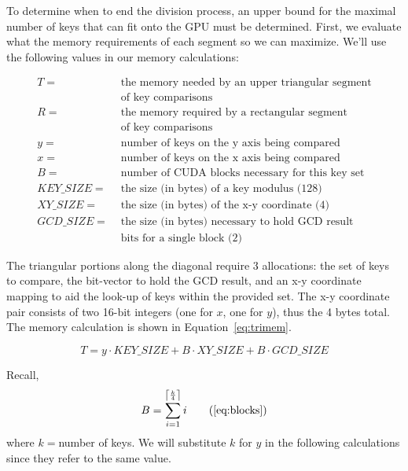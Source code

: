 \documentclass[12pt]{ucthesis}
\begin{document}
To determine when to end the division process, an upper bound for the maximal
number of keys that can fit onto the GPU must be determined. First, we evaluate
what the memory requirements of each segment so we can maximize. We'll use the
following values in our memory calculations:

\begin{displaymath}
   \begin{split}
   T = & \mbox{ the memory needed by an upper triangular segment}\\
       & \mbox{ of key comparisons}\\
   R = & \mbox{ the memory required by a rectangular segment}\\
       & \mbox{ of key comparisons}\\
   y = & \mbox{ number of keys on the y axis being compared}\\
   x = & \mbox{ number of keys on the x axis being compared}\\
   B = & \mbox{ number of CUDA blocks necessary for this key set}\\
   KEY\_SIZE = & \mbox{ the size (in bytes) of a key modulus (128)}\\
   XY\_SIZE = & \mbox{ the size (in bytes) of the x-y coordinate (4)}\\
   GCD\_SIZE = & \mbox{ the size (in bytes) necessary to hold GCD result}\\
               & \mbox{ bits for a single block (2)}
   \end{split}
\end{displaymath}

The triangular portions along the diagonal require 3 allocations: the set of
keys to compare, the bit-vector to hold the GCD result, and an x-y coordinate
mapping to aid the look-up of keys within the provided set. The x-y coordinate
pair consists of two 16-bit integers (one for $x$, one for $y$), thus the 4
bytes total. The memory calculation is shown in Equation~\ref{eq:trimem}.  

\begin{equation}
   T = y \cdot KEY\_SIZE + B \cdot XY\_SIZE + B \cdot GCD\_SIZE
   \label{eq:trimem}
\end{equation}

\noindent Recall,
\begin{equation}
   B = \sum_{i=1}^{\left\lceil \frac{k}{4} \right\rceil}i
   \tag{\ref{eq:blocks}}
\end{equation}
where $k = $number of keys. We will substitute $k$ for $y$ in the following
calculations since they refer to the same value.  
\end{document}
